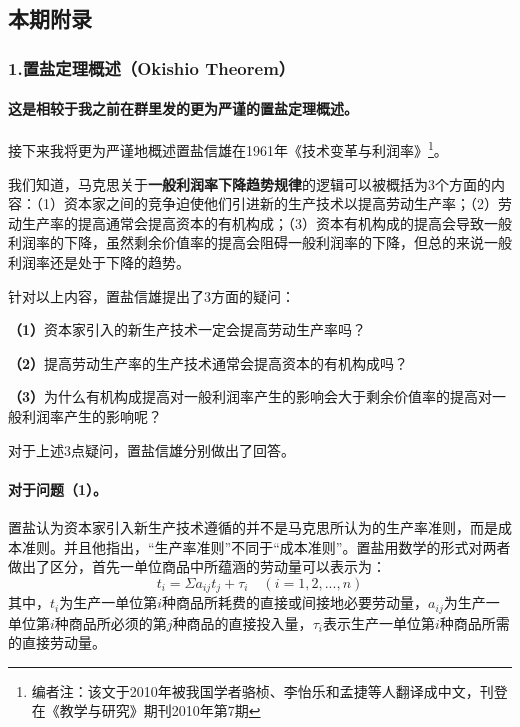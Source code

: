 \documentclass[a4paper,twoside,12pt,AutoFakeBold]{ctexart}
\begin{document}
\newpage
\subsection{本期附录}
\subsubsection{1.置盐定理概述（Okishio Theorem）}
\paragraph{这是相较于我之前在群里发的更为严谨的置盐定理概述。} 

接下来我将更为严谨地概述置盐信雄在1961年《技术变革与利润率》\footnote{编者注：该文于2010年被我国学者骆桢、李怡乐和孟捷等人翻译成中文，刊登在《教学与研究》期刊2010年第7期}。

\vspace{0.5cm} %

我们知道，马克思关于\textbf{一般利润率下降趋势规律}的逻辑可以被概括为3个方面的内容：（1）资本家之间的竞争迫使他们引进新的生产技术以提高劳动生产率；（2）劳动生产率的提高通常会提高资本的有机构成；（3）资本有机构成的提高会导致一般利润率的下降，虽然剩余价值率的提高会阻碍一般利润率的下降，但总的来说一般利润率还是处于下降的趋势。

针对以上内容，置盐信雄提出了3方面的疑问：
\begin{tcolorbox}[colback=gray!20, colframe=gray!100, sharp corners, leftrule={3pt}, rightrule={0pt}, toprule={0pt}, bottomrule={0pt}, left={2pt}, right={2pt}, top={3pt}, bottom={3pt}] 
\textbf{（1）}资本家引入的新生产技术一定会提高劳动生产率吗？

\textbf{（2）}提高劳动生产率的生产技术通常会提高资本的有机构成吗？

\textbf{（3）}为什么有机构成提高对一般利润率产生的影响会大于剩余价值率的提高对一般利润率产生的影响呢？

\end{tcolorbox}


对于上述3点疑问，置盐信雄分别做出了回答。

\paragraph{对于问题（1）。}置盐认为资本家引入新生产技术遵循的并不是马克思所认为的生产率准则，而是成本准则。并且他指出，“生产率准则”不同于“成本准则”。置盐用数学的形式对两者做出了区分，首先一单位商品中所蕴涵的劳动量可以表示为：
\begin{equation}\tag{1}
    t_i=\Sigma a_{ij}t_j+\tau_i \quad (i=1,2,...,n)
\end{equation}
其中，$t_i$为生产一单位第$i$种商品所耗费的直接或间接地必要劳动量，$a_{ij}$为生产一单位第$i$种商品所必须的第$j$种商品的直接投入量，$\tau_i$表示生产一单位第$i$种商品所需的直接劳动量。
\end{document}
